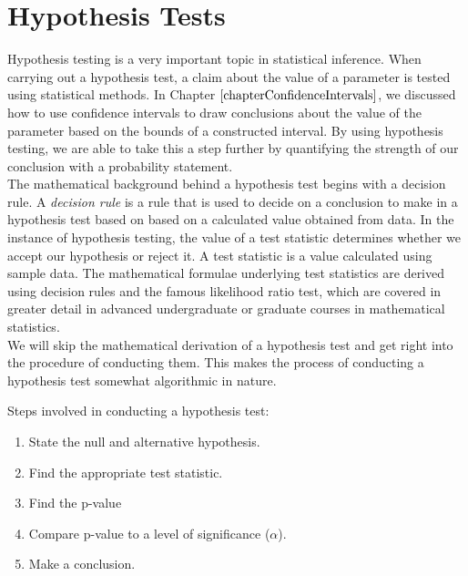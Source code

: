 \chapter{Hypothesis Tests}
\label{chapterHypothesisTests}

Hypothesis testing is a very important topic in statistical inference. When carrying out a hypothesis test, a claim about the value of a parameter is tested using statistical methods. In Chapter $\ref{chapterConfidenceIntervals}$, we discussed how to use confidence intervals to draw conclusions about the value of the parameter based on the bounds of a constructed interval. By using hypothesis testing, we are able to take this a step further by quantifying the strength of our conclusion with a probability statement.\\

The mathematical background behind a hypothesis test begins with a decision rule. 
A \textit{decision rule} is a rule that is used to decide on a conclusion to make in a hypothesis test based on
based on a calculated value obtained from data.
In the instance of hypothesis testing, the value of a test statistic determines whether we accept our hypothesis or reject it. A test statistic is a value calculated using sample data. The mathematical formulae underlying test statistics are derived using decision rules and the famous likelihood ratio test, which are covered in greater detail in advanced undergraduate or graduate courses in mathematical statistics.\\

We will skip the mathematical derivation of a hypothesis test and get right into the procedure of conducting them. This makes the process of conducting a hypothesis test somewhat algorithmic in nature.

\begin{algorithm}[]
Steps involved in conducting a hypothesis test:

\begin{enumerate}
\item	State the null and alternative hypothesis.
\item	Find the appropriate test statistic.
\item	Find the p-value
\item	Compare p-value to a level of significance ($\alpha$).
\item	Make a conclusion.
\end{enumerate}
\end{algorithm}


